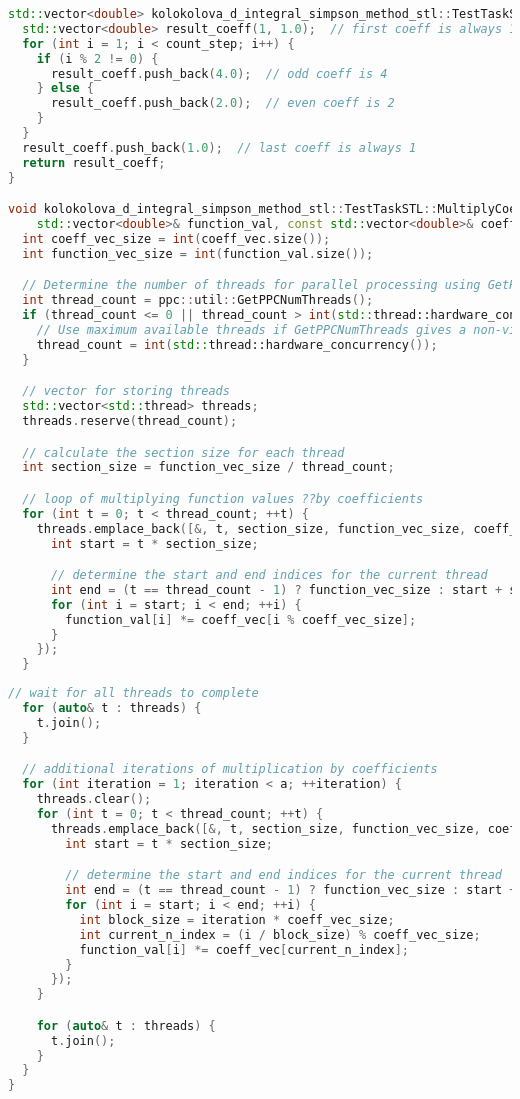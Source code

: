 \documentclass[12pt]{article}
\begin{document}
\begin{lstlisting}[language=C++]
std::vector<double> kolokolova_d_integral_simpson_method_stl::TestTaskSTL::FindCoeff(int count_step) {
  std::vector<double> result_coeff(1, 1.0);  // first coeff is always 1
  for (int i = 1; i < count_step; i++) {
    if (i % 2 != 0) {
      result_coeff.push_back(4.0);  // odd coeff is 4
    } else {
      result_coeff.push_back(2.0);  // even coeff is 2
    }
  }
  result_coeff.push_back(1.0);  // last coeff is always 1
  return result_coeff;
}

void kolokolova_d_integral_simpson_method_stl::TestTaskSTL::MultiplyCoeffandFunctionValue(
    std::vector<double>& function_val, const std::vector<double>& coeff_vec, int a) {
  int coeff_vec_size = int(coeff_vec.size());
  int function_vec_size = int(function_val.size());

  // Determine the number of threads for parallel processing using GetPPCNumThreads
  int thread_count = ppc::util::GetPPCNumThreads();
  if (thread_count <= 0 || thread_count > int(std::thread::hardware_concurrency())) {
    // Use maximum available threads if GetPPCNumThreads gives a non-viable count
    thread_count = int(std::thread::hardware_concurrency());
  }

  // vector for storing threads
  std::vector<std::thread> threads;
  threads.reserve(thread_count);

  // calculate the section size for each thread
  int section_size = function_vec_size / thread_count;

  // loop of multiplying function values ??by coefficients
  for (int t = 0; t < thread_count; ++t) {
    threads.emplace_back([&, t, section_size, function_vec_size, coeff_vec_size]() {
      int start = t * section_size;

      // determine the start and end indices for the current thread
      int end = (t == thread_count - 1) ? function_vec_size : start + section_size;
      for (int i = start; i < end; ++i) {
        function_val[i] *= coeff_vec[i % coeff_vec_size];
      }
    });
  }
\end{lstlisting}
\begin{lstlisting}[language=C++]
  // wait for all threads to complete
  for (auto& t : threads) {
    t.join();
  }

  // additional iterations of multiplication by coefficients
  for (int iteration = 1; iteration < a; ++iteration) {
    threads.clear();
    for (int t = 0; t < thread_count; ++t) {
      threads.emplace_back([&, t, section_size, function_vec_size, coeff_vec_size, iteration]() {
        int start = t * section_size;

        // determine the start and end indices for the current thread
        int end = (t == thread_count - 1) ? function_vec_size : start + section_size;
        for (int i = start; i < end; ++i) {
          int block_size = iteration * coeff_vec_size;
          int current_n_index = (i / block_size) % coeff_vec_size;
          function_val[i] *= coeff_vec[current_n_index];
        }
      });
    }

    for (auto& t : threads) {
      t.join();
    }
  }
}
\end{lstlisting}
\newpage
\end{document}
